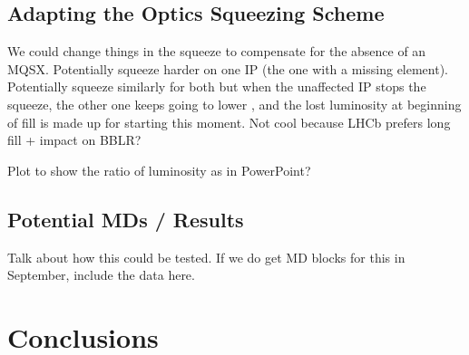 \subsection{Adapting the Optics Squeezing Scheme}

We could change things in the squeeze to compensate for the absence of an MQSX.
Potentially squeeze harder on one IP (the one with a missing element).
Potentially squeeze similarly for both but when the unaffected IP stops the squeeze, the other one keeps going to lower \betastar, and the lost luminosity at beginning of fill is made up for starting this moment.
Not cool because LHCb prefers long fill + impact on BBLR?

Plot to show the ratio of luminosity as in PowerPoint?

\subsection{Potential MDs / Results}

Talk about how this could be tested.
If we do get MD blocks for this in September, include the data here.


\section{Conclusions}

